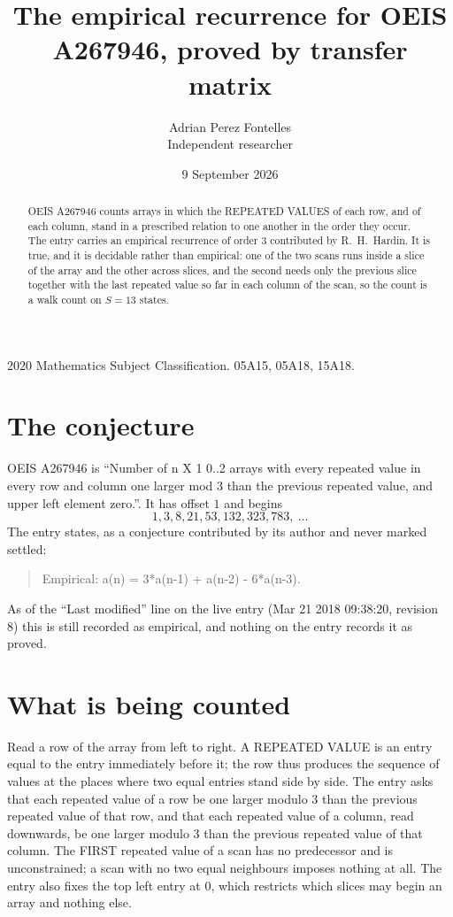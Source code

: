 \documentclass[11pt,a4paper]{article}
\title{The empirical recurrence for OEIS A267946, proved by transfer matrix}
\author{Adrian Perez Fontelles\\ \small Independent researcher}
\date{9 September 2026}
\theoremstyle{plain}
\theoremstyle{definition}
\begin{document}
\maketitle

\begin{abstract}
OEIS A267946 counts arrays in which the REPEATED VALUES of each row, and of each column, stand in a
prescribed relation to one another in the order they occur. The entry carries an empirical
recurrence of order $3$ contributed by R.~H.~Hardin. It is true, and it is decidable
rather than empirical: one of the two scans runs inside a slice of the array and the other
across slices, and the second needs only the previous slice together with the last repeated
value so far in each column of the scan, so the count is a walk count on $S=13$ states.
\end{abstract}

\noindent\small 2020 Mathematics Subject Classification. 05A15, 05A18, 15A18.\normalsize

\section{The conjecture}

OEIS A267946 is ``Number of n X 1 0..2 arrays with every repeated value in every row and column one larger mod 3 than the previous repeated value, and upper left element zero.''. It has offset $1$ and begins
\[
1, 3, 8, 21, 53, 132, 323, 783,\ \dots
\]
The entry states, as a conjecture contributed by its author and never marked settled:
\begin{quote}
Empirical: a(n) = 3*a(n-1) + a(n-2) - 6*a(n-3).
\end{quote}
As of the ``Last modified'' line on the live entry (Mar 21 2018 09:38:20, revision 8) this is still
recorded as empirical, and nothing on the entry records it as proved.

\section{What is being counted}

Read a row of the array from left to right. A REPEATED VALUE is an entry equal to the entry
immediately before it; the row thus produces the sequence of values at the places where two
equal entries stand side by side. The entry asks that each repeated value of a row be
one larger modulo 3 than the previous repeated value of that row, and that each repeated value of a column,
read downwards, be one larger modulo 3 than the previous repeated value of that column. The FIRST repeated
value of a scan has no predecessor and is unconstrained; a scan with no two equal neighbours
imposes nothing at all. The entry also fixes the top left entry at $0$, which restricts which slices may begin an array and nothing else.
\end{document}
